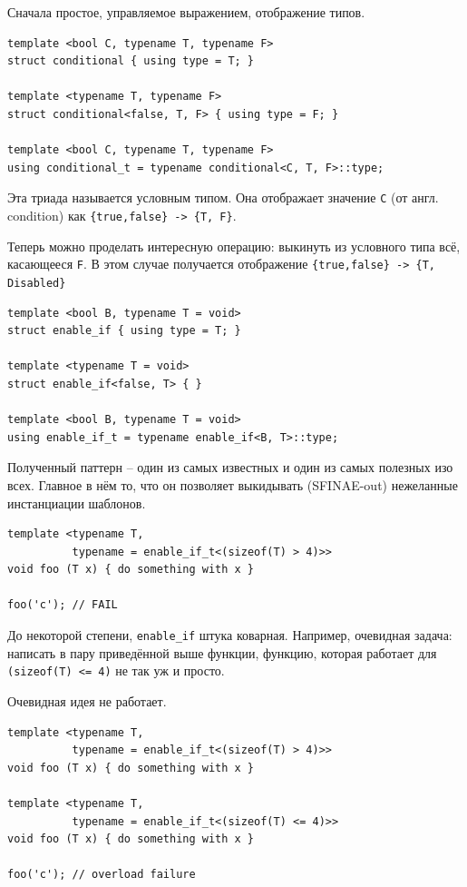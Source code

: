 \documentclass[a4paper,12pt,oneside]{article}
\begin{document}
Сначала простое, управляемое выражением, отображение типов.

\begin{lstlisting}
template <bool C, typename T, typename F> 
struct conditional { using type = T; }

template <typename T, typename F> 
struct conditional<false, T, F> { using type = F; }

template <bool C, typename T, typename F> 
using conditional_t = typename conditional<C, T, F>::type;
\end{lstlisting}

Эта триада называется условным типом. Она отображает значение \lstinline!C! (от англ. condition) как \lstinline!{true,false} -> {T, F}!.

Теперь можно проделать интересную операцию: выкинуть из условного типа всё, касающееся \lstinline!F!. В этом случае получается отображение \lstinline!{true,false} -> {T, Disabled}!

\begin{lstlisting}
template <bool B, typename T = void> 
struct enable_if { using type = T; }

template <typename T = void> 
struct enable_if<false, T> { }

template <bool B, typename T = void> 
using enable_if_t = typename enable_if<B, T>::type;
\end{lstlisting}

Полученный паттерн -- один из самых известных и один из самых полезных изо всех. Главное в нём то, что он позволяет выкидывать (SFINAE-out) нежеланные инстанциации шаблонов.

\begin{lstlisting}
template <typename T, 
          typename = enable_if_t<(sizeof(T) > 4)>>
void foo (T x) { do something with x }

foo('c'); // FAIL
\end{lstlisting}

До некоторой степени, \lstinline!enable_if! штука коварная. Например, очевидная задача: написать в пару приведённой выше функции, функцию, которая работает для \lstinline!(sizeof(T) <= 4)! не так уж и просто.

Очевидная идея не работает.

\begin{lstlisting}
template <typename T, 
          typename = enable_if_t<(sizeof(T) > 4)>>
void foo (T x) { do something with x }

template <typename T, 
          typename = enable_if_t<(sizeof(T) <= 4)>>
void foo (T x) { do something with x }

foo('c'); // overload failure
\end{lstlisting}
\end{document}
